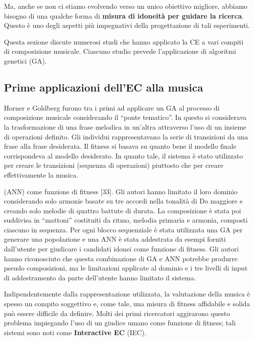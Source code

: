 \documentclass[a4paper,12pt]{report}
\begin{document}
Ma, anche se non ci stiamo evolvendo verso un unico obiettivo migliore, abbiamo bisogno di una qualche forma di \textbf{misura di idoneità per guidare la ricerca}. 
Questo è uno degli aspetti più impegnativi della progettazione di tali esperimenti.

Questa sezione discute numerosi studi che hanno applicato la CE a vari compiti di composizione musicale. 
Ciascuno studio prevede l'applicazione di algoritmi genetici (GA).

\subsection{Prime applicazioni dell'EC alla musica}


Horner e Goldberg furono tra i primi ad applicare un GA al processo di composizione musicale considerando il “ponte tematico”. 
In questo si considerava la trasformazione di una frase melodica in un'altra attraverso l'uso di un insieme di operazioni definito. 
Gli individui rappresentavano la serie di transizioni da una frase alla frase desiderata. 
Il fitness si basava su quanto bene il modello finale corrispondeva al modello desiderato. 
In quanto tale, il sistema è stato utilizzato per creare le transizioni (sequenza di operazioni) piuttosto che per creare effettivamente la musica. 

 (ANN) come funzione di fitness [33]. 
 Gli autori hanno limitato il loro dominio considerando solo armonie basate su tre accordi nella tonalità di Do maggiore e creando solo melodie di quattro battute di durata. La composizione è stata poi suddivisa in “mattoni” costituiti da ritmo, melodia primaria e armonia, composti ciascuno in sequenza. 
 Per ogni blocco sequenziale è stata utilizzata una GA per generare una popolazione e una ANN è stata addestrata da esempi forniti dall'utente per giudicare i candidati idonei come funzione di fitness. 
 Gli autori hanno riconosciuto che questa combinazione di GA e ANN potrebbe produrre pseudo composizioni, 
 ma le limitazioni applicate al dominio e i tre livelli di input di addestramento da parte dell'utente hanno limitato il sistema.
 
Indipendentemente dalla rappresentazione utilizzata, la valutazione della musica è spesso un compito soggettivo e, come tale, una misura di fitness affidabile e solida può essere difficile da definire. Molti dei primi ricercatori aggirarono questo problema impiegando l'uso di un giudice umano come funzione di fitness; 
tali sistemi sono noti come \textbf{Interactive EC} (IEC). 
\end{document}
